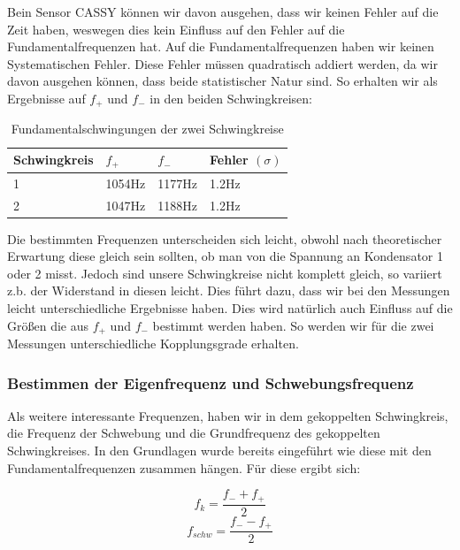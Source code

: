\documentclass[twoside]{protokoll}
\begin{document}
Bein Sensor CASSY können wir davon ausgehen, dass wir keinen Fehler auf die Zeit haben, weswegen dies kein Einfluss auf den Fehler auf die Fundamentalfrequenzen hat.
Auf die Fundamentalfrequenzen haben wir keinen Systematischen Fehler.
Diese Fehler müssen quadratisch addiert werden, da wir davon ausgehen können, dass beide statistischer Natur sind.
So erhalten wir als Ergebnisse auf $ f_+$ und $ f_-$ in den beiden Schwingkreisen:

\begin{table}[H]
    \centering
    \begin{tabularx}{1\textwidth}{X X X X} %
        \toprule
        \textbf{Schwingkreis} & \textbf{$f_+$ } & \textbf{$f_-$ } & \textbf{Fehler $(\sigma)$}\\
        \midrule
        1 & 1054Hz & 1177Hz & 1.2Hz\\
        2 & 1047Hz & 1188Hz & 1.2Hz\\
        \bottomrule
    \end{tabularx}
    \caption{Fundamentalschwingungen der zwei Schwingkreise}
    \label{•}
\end{table}

Die bestimmten Frequenzen unterscheiden sich leicht, obwohl nach theoretischer Erwartung diese gleich sein sollten, ob man von die Spannung an Kondensator 1 oder 2 misst.
Jedoch sind unsere Schwingkreise nicht komplett gleich, so variiert z.b. der Widerstand in diesen leicht. Dies führt dazu, dass wir bei den Messungen leicht unterschiedliche Ergebnisse haben. 
Dies wird natürlich auch Einfluss auf die Größen die aus $f_+$ und $f_-$ bestimmt werden haben. So werden wir für die zwei Messungen unterschiedliche Kopplungsgrade erhalten.
\subsubsection{Bestimmen der Eigenfrequenz und Schwebungsfrequenz}


Als weitere interessante Frequenzen, haben wir in dem gekoppelten Schwingkreis, die Frequenz der Schwebung und die Grundfrequenz des gekoppelten Schwingkreises. 
In den Grundlagen wurde bereits eingeführt wie diese mit den Fundamentalfrequenzen zusammen hängen.
Für diese ergibt sich:

\begin{equation}
    f_k = \frac{f_- + f_+}{2}
    \label{Funktion f Schwebung}
\end{equation}
\begin{equation}
    f_{schw} = \frac{f_- - f_+}{2}
    \label{Funktion f grund}
\end{equation}
\end{document}
